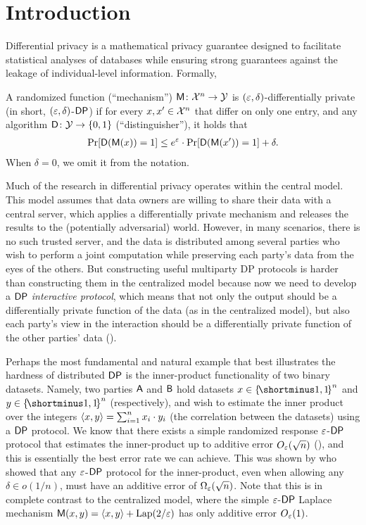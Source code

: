 \section{Introduction}


Differential privacy \cite{DMNS06} is a mathematical privacy guarantee designed to facilitate statistical analyses of databases while ensuring strong guarantees against the leakage of individual-level information. 
Formally, 
\begin{definition}\label{def:intro:DP}
	A randomized function (``mechanism'') $\mathsf{M} \colon {\cal X}^n \rightarrow {\cal Y}$ is $(\varepsilon,\delta)$-differentially private (in short, $(\varepsilon,\delta)$-${\sf DP}$) if for every $x,x' \in {\cal X}^n$ that differ on only one entry, and any algorithm $\Dc\colon \cY \rightarrow \zo$ (``distinguisher''), it holds that
	\begin{align}\label{eq:intro:DP}
		\pr{\Dc(\Mc(x)) = 1} \leq e^{\eps}\cdot \pr{\Dc(\Mc(x')) = 1} + \delta.
	\end{align}
        When $\delta = 0$, we omit it from the notation.
\end{definition}

Much of the research in differential privacy operates within the central model. This model assumes that data owners are willing to share their data with a central server, which applies a differentially private mechanism and releases the results to the (potentially adversarial) world. However, in many scenarios, there is no such trusted server, and the data is distributed among several parties who wish to perform a joint computation while preserving each party's data from the eyes of the others.
But constructing useful multiparty DP protocols is harder than constructing them in the centralized model because now we need to develop a ${\sf DP}$ \emph{interactive protocol}, which means that not only the output should be a differentially private function of the data (as in the centralized model), but also each party's view in the interaction should be a differentially private function of the other parties' data (\cite{DN04,BNO08}).

Perhaps the most fundamental and natural example that best illustrates the hardness of distributed ${\sf DP}$ is the inner-product functionality of two binary datasets. 
Namely, two parties $\mathsf{A}$ and $\mathsf{B}$ hold datasets $x \in \oo^n$ and $y \in \oo^n$ (respectively), and wish to estimate the inner product over the integers $\langle x,y \rangle = \sum_{i=1}^n x_i \cdot y_i$ (the correlation between the datasets) using a ${\sf DP}$ protocol.
We know that there exists a simple randomized response $\varepsilon$-${\sf DP}$ protocol that estimates the inner-product up to additive error $O_{\varepsilon}(\sqrt{n})$ (\cite{McGregorMPRTV10,MPRV09}), and this is essentially the best error rate we can achieve. This was shown by \cite{McGregorMPRTV10,HaitnerMST22} who showed that any $\varepsilon$-${\sf DP}$ protocol for the inner-product, even when allowing any $\delta \in o(1/n)$, must have an additive error of $\Omega_{\varepsilon}(\sqrt{n})$. Note that this is in complete contrast to the centralized model, where the simple $\varepsilon$-${\sf DP}$ Laplace mechanism $\mathsf{M}(x,y) = \langle x,y \rangle + {\rm Lap}(2/\varepsilon)$ has only additive error $O_{\varepsilon}(1)$. 

